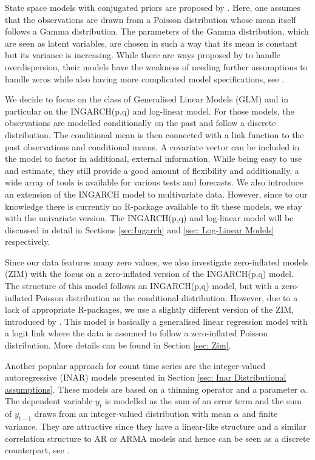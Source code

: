 State space models with conjugated priors are proposed by \textcite{Harvey:1989}. Here, one assumes that the observations are drawn from a Poisson distribution whose mean itself follows a Gamma distribution. The parameters of the Gamma distribution, which are seen as latent variables, are chosen in such a way that its mean is constant but its variance is increasing. While there are ways proposed by \textcite{Qaqish:1988} to handle overdispersion, their models have the weakness of needing further assumptions to handle zeros while also having more complicated model specifications, see \textcite{Heinen:2003}.

We decide to focus on the class of Generalised Linear Models (GLM) and in particular on the INGARCH(p,q) and log-linear model. For those models, the observations are modelled conditionally on the past and follow a discrete distribution. The conditional mean is then connected with a link function to the past observations and conditional means. A covariate vector can be included in the model to factor in additional, external information. While being easy to use and estimate, they still provide a good amount of flexibility and additionally, a wide array of tools is available for various tests and forecasts. We also introduce an extension of the INGARCH model to multivariate data. However, since to our knowledge there is currently no R-package available to fit these models, we stay with the univariate version. The INGARCH(p,q) and log-linear model will be discussed in detail in Sections \ref{sec:Ingarch} and \ref{sec: Log-Linear Models} respectively.

Since our data features many zero values, we also investigate zero-inflated models (ZIM) with the focus on a zero-inflated version of the INGARCH(p,q) model. The structure of this model follows an INGARCH(p,q) model, but with a zero-inflated Poisson distribution as the conditional distribution. However, due to a lack of appropriate R-packages, we use a slightly different version of the ZIM, introduced by \textcite{Lambert:1992}. This model is basically a generalised linear regression model with a logit link where the data is assumed to follow a zero-inflated Poisson distribution. More details can be found in Section \ref{sec: Zim}.

Another popular approach for count time series are the integer-valued autoregressive (INAR) models presented in Section \ref{sec: Inar Distributional assumptions}. These models are based on a thinning operator and a parameter $\alpha$. The dependent variable $y_t$ is modelled as the sum of an error term and the sum of $y_{t-1}$ draws from an integer-valued distribution with mean $\alpha$ and finite variance. They are attractive since they have a linear-like structure and a similar correlation structure to AR or ARMA models and hence can be seen as a discrete counterpart, see \textcite{Heinen:2003}. 

